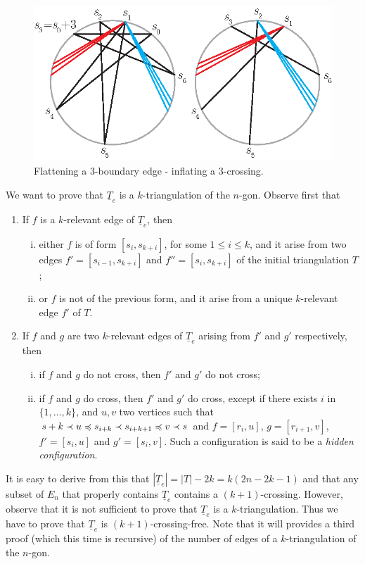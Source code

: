 \documentclass[12pt]{amsart}
\begin{document}
\begin{figure}
\centerline{\includegraphics[scale=1]{flatinfl.eps}}
\caption{\small{Flattening a $3$-boundary edge - inflating a $3$-crossing.}}\label{flatinfl}
\end{figure}

\medskip
We want to prove that $\underline{T}_e$ is a $k$-triangulation of the $n$-gon. Observe first that
\begin{enumerate}
\item If $f$ is a $k$-relevant edge of $\underline{T}_e$, then
\begin{enumerate}[(i)]
\item either $f$ is of form $[s_i,s_{k+i}]$, for some $1\le i\le k$, and it arise from two edges $f'=[s_{i-1},s_{k+i}]$ and $f''=[s_i,s_{k+i}]$ of the initial triangulation $T$;
\item or $f$ is not of the previous form, and it arise from a unique $k$-relevant edge $f'$ of $T$.
\end{enumerate}

\item If $f$ and $g$ are two $k$-relevant edges of $\underline{T}_e$ arising from $f'$ and $g'$ respectively, then
\begin{enumerate}[(i)]
\item if $f$ and $g$ do not cross, then $f'$ and $g'$ do not cross; 
\item if $f$ and $g$ do cross, then $f'$ and $g'$ do cross, except if there exists $i$ in $\{1,\ldots,k\}$, and $u,v$ two vertices such that $s+k\prec u\preccurlyeq s_{i+k}\prec s_{i+k+1}\preccurlyeq v\prec s$ and $f=[r_i,u]$, $g=[r_{i+1},v]$, $f'=[s_i,u]$ and $g'=[s_i,v]$. Such a configuration is said to be a \emph{hidden configuration}.
\end{enumerate}
\end{enumerate}

It is easy to derive from this that $|\underline{T}_e|=|T|-2k=k(2n-2k-1)$ and that any subset of $E_n$ that properly contains $\underline{T}_e$ contains a $(k+1)$-crossing. However, observe that it is not sufficient to prove that $\underline{T}_e$ is a $k$-triangulation. Thus we have to prove that $\underline{T}_e$ is $(k+1)$-crossing-free. Note that it will provides a third proof (which this time is recursive) of the number of edges of a $k$-triangulation of the $n$-gon.
\end{document}
